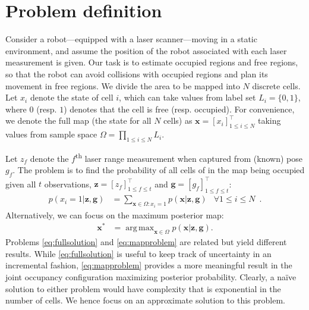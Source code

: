 \documentclass[letterpaper, 10 pt, conference]{ieeeconf} %
\DeclareMathOperator*{\argmax}{arg\,max}
\newcommand{\vect}[1]{\mathbf{#1}}
\begin{document}
\section{Problem definition}
\newcommand{\map}{\vect{x}}
\newcommand{\meas}{z}
\newcommand{\measurements}{\vect{\meas}}
\newcommand{\pose}{g}
\newcommand{\poses}{\vect{\pose}}
\newcommand{\unaryminus}{\scalebox{0.5}[0.5]{\( - \)}}
\newcommand{\prevtime}{1:t\unaryminus1}
\newcommand{\pastobs}{\measurements_{1:t\unaryminus1}, \poses_{1:t\unaryminus1}}
Consider a robot---equipped with a laser scanner---moving in a static
environment, and assume the position of the robot associated with each laser
measurement is given. Our task is to estimate occupied regions and free
regions, so that the robot can avoid collisions with occupied regions and plan its
movement in free regions.
We divide the area to be mapped into $N$ discrete cells. Let $x_i$ denote the
state of cell $i$, which can take values from label set $L_i = \{0, 1\}$, where
$0$ (resp. $1$) denotes that the cell is free (resp. occupied). 
For convenience, we denote the full map (the state for all $N$ cells) as $\map = [x_i]^\top_{1
\le i \le N}$ taking values from sample space $\Omega =
\prod_{1 \le i \le N}L_i$.


Let $\meas_f$ denote the $f$\textsuperscript{th} laser range measurement when 
captured from (known) pose $\pose_f$. 
The problem is to find the probability of all cells of in the map being occupied
given all $t$ observations, $\measurements = [\meas_f]^\top_{1 \le f \le t}$ and
$\poses = [\pose_f]^\top_{1 \le f \le t}$:
%
\begin{align}
  p(x_i = 1 | \measurements, \poses) &= \sum_{\map \in \Omega : x_i = 1} p(\map 
  | \measurements , \poses) & \forall 1 \le i \le N \enspace. \label{eq:fullsolution}
\end{align}
%
Alternatively, we can focus on the maximum posterior map:
%
\begin{align}
  \map^* &= \argmax_{\map \in \Omega } p(\map | \measurements, \poses)
  .
  \label{eq:mapproblem}
\end{align}
%
Problems \eqref{eq:fullsolution} and \eqref{eq:mapproblem} are related
but yield different results. While \eqref{eq:fullsolution} is
useful to keep track of uncertainty in an incremental fashion,
\eqref{eq:mapproblem} provides a more meaningful result in the joint
occupancy configuration maximizing posterior probability.
%
Clearly, a na\"{i}ve solution to either problem would have complexity that is 
exponential in the number of cells. We hence focus on an approximate solution to this problem.
\end{document}
